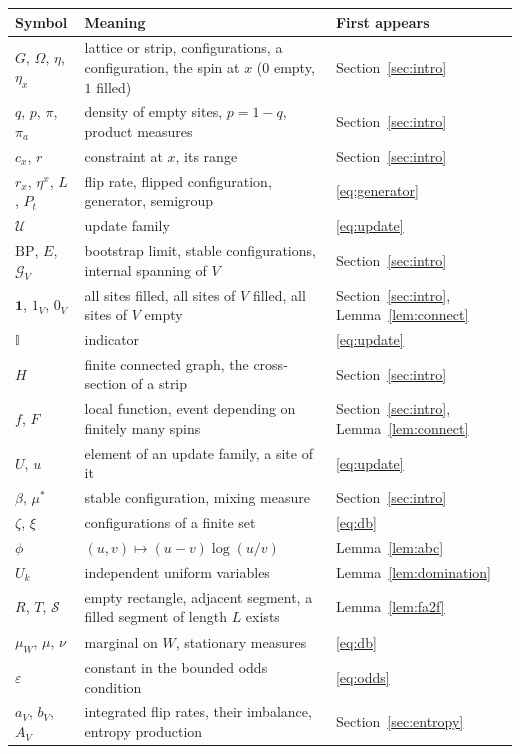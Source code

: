 \documentclass[11pt]{amsart}
\theoremstyle{remark}
\newcommand{\cU}{\mathcal{U}}
\newcommand{\BP}{\mathrm{BP}}
\begin{document}
\begin{center}
\begin{tabular}{p{3.3cm}p{7.6cm}p{3.2cm}}
\toprule
Symbol & Meaning & First appears\\
\midrule
$G$, $\Omega$, $\eta$, $\eta_x$ & lattice or strip, configurations, a configuration, the spin at $x$ ($0$ empty, $1$ filled) & Section~\ref{sec:intro}\\
$q$, $p$, $\pi$, $\pi_a$ & density of empty sites, $p=1-q$, product measures & Section~\ref{sec:intro}\\
$c_x$, $r$ & constraint at $x$, its range & Section~\ref{sec:intro}\\
$r_x$, $\eta^x$, $L$, $P_t$ & flip rate, flipped configuration, generator, semigroup & \eqref{eq:generator}\\
$\cU$ & update family & \eqref{eq:update}\\
$\BP$, $E$, $\mathcal G_V$ & bootstrap limit, stable configurations, internal spanning of $V$ & Section~\ref{sec:intro}\\
$\mathbf 1$, $1_V$, $0_V$ & all sites filled, all sites of $V$ filled, all sites of $V$ empty & Section~\ref{sec:intro}, Lemma~\ref{lem:connect}\\
$\mathbb I$ & indicator & \eqref{eq:update}\\
$H$ & finite connected graph, the cross-section of a strip & Section~\ref{sec:intro}\\
$f$, $F$ & local function, event depending on finitely many spins & Section~\ref{sec:intro}, Lemma~\ref{lem:connect}\\
$U$, $u$ & element of an update family, a site of it & \eqref{eq:update}\\
$\beta$, $\mu^*$ & stable configuration, mixing measure & Section~\ref{sec:intro}\\
$\zeta$, $\xi$ & configurations of a finite set & \eqref{eq:db}\\
$\phi$ & $(u,v)\mapsto(u-v)\log(u/v)$ & Lemma~\ref{lem:abc}\\
$U_k$ & independent uniform variables & Lemma~\ref{lem:domination}\\
$R$, $T$, $\mathcal S$ & empty rectangle, adjacent segment, a filled segment of length $L$ exists & Lemma~\ref{lem:fa2f}\\
$\mu_W$, $\mu$, $\nu$ & marginal on $W$, stationary measures & \eqref{eq:db}\\
$\varepsilon$ & constant in the bounded odds condition & \eqref{eq:odds}\\
$a_V$, $b_V$, $A_V$ & integrated flip rates, their imbalance, entropy production & Section~\ref{sec:entropy}\\

\end{tabular}
\end{center}
\end{document}
